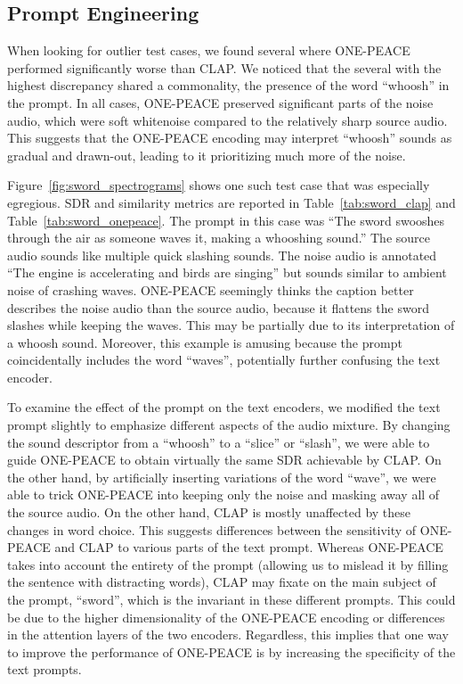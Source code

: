 \documentclass[11pt]{article}
\begin{document}
\subsection{Prompt Engineering}

When looking for outlier test cases, we found several where ONE-PEACE performed significantly worse than CLAP. We noticed that the several with the highest discrepancy shared a commonality, the presence of the word ``whoosh'' in the prompt. In all cases, ONE-PEACE preserved significant parts of the noise audio, which were soft whitenoise compared to the relatively sharp source audio. This suggests that the ONE-PEACE encoding may interpret ``whoosh'' sounds as gradual and drawn-out, leading to it prioritizing much more of the noise.

Figure~\ref{fig:sword_spectrograms} shows one such test case that was especially egregious. SDR and similarity metrics are reported in Table~\ref{tab:sword_clap} and Table~\ref{tab:sword_onepeace}. The prompt in this case was ``The sword swooshes through the air as someone waves it, making a whooshing sound.'' The source audio sounds like multiple quick slashing sounds. The noise audio is annotated ``The engine is accelerating and birds are singing'' but sounds similar to ambient noise of crashing waves. ONE-PEACE seemingly thinks the caption better describes the noise audio than the source audio, because it flattens the sword slashes while keeping the waves. This may be partially due to its interpretation of a whoosh sound. Moreover, this example is amusing because the prompt coincidentally includes the word ``waves'', potentially further confusing the text encoder.

To examine the effect of the prompt on the text encoders, we modified the text prompt slightly to emphasize different aspects of the audio mixture. By changing the sound descriptor from a ``whoosh'' to a ``slice'' or ``slash'', we were able to guide ONE-PEACE to obtain virtually the same SDR achievable by CLAP. On the other hand, by artificially inserting variations of the word ``wave'', we were able to trick ONE-PEACE into keeping only the noise and masking away all of the source audio. On the other hand, CLAP is mostly unaffected by these changes in word choice. This suggests differences between the sensitivity of ONE-PEACE and CLAP to various parts of the text prompt. Whereas ONE-PEACE takes into account the entirety of the prompt (allowing us to mislead it by filling the sentence with distracting words), CLAP may fixate on the main subject of the prompt, ``sword'', which is the invariant in these different prompts. This could be due to the higher dimensionality of the ONE-PEACE encoding or differences in the attention layers of the two encoders. Regardless, this implies that one way to improve the performance of ONE-PEACE is by increasing the specificity of the text prompts.
\end{document}
